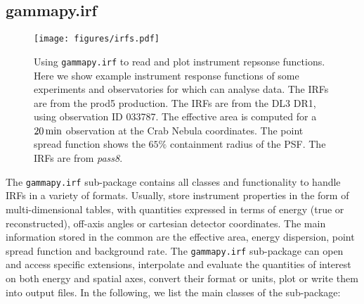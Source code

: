 \documentclass[traditabstract, longauth]{aa}
\newcommand{\code}[1]{\texttt{#1}}
\begin{document}
\subsection{gammapy.irf}
\label{ssec:gammapy-irf}
%
%
\begin{figure*}[ht!]
	\centering
	\texttt{[image: figures/irfs.pdf]}
	\caption{
		Using \code{gammapy.irf} to read and plot instrument repsonse functions.
		Here we show example instrument response functions of some experiments and
        observatories for which \gammapy can analyse data. The \cta IRFs
        are from the prod5 production. The \hess IRFs are from the DL3 DR1,
        using observation ID 033787. The \magic effective area is computed for a
        $20\,{\rm min}$ observation at the Crab Nebula coordinates.
        The point spread function shows the $65\%$
        containment radius of the PSF. The \fermi IRFs are from \textit{pass8}.
    }
	\label{fig:irfs}
\end{figure*}
%
%

The \code{gammapy.irf} sub-package contains all classes and functionality
to handle IRFs in a variety of formats.
Usually, \irfs store instrument properties in the form of multi-dimensional
tables, with quantities expressed in terms of energy (true or reconstructed),
off-axis angles or cartesian detector coordinates. The main information stored in
the common \gammaray \irfs are the effective area, energy dispersion,
point spread function and background rate. The \code{gammapy.irf}
sub-package can open and access specific \irf extensions,
interpolate and evaluate the quantities of interest on both energy and spatial
axes, convert their format or units, plot or write them into
output files. In the following, we list the main classes of the
sub-package:
\end{document}
